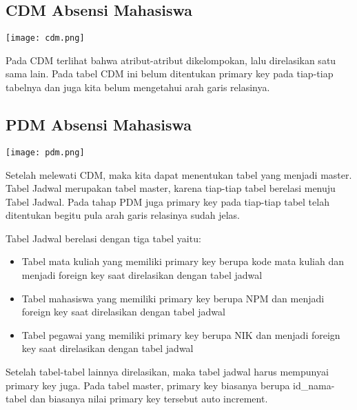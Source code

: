 \documentclass[a4paper,12pt] {article}
\begin{document}
\subsection{CDM Absensi Mahasiswa}
\vspace{0.5cm}
\begin{center}
\texttt{[image: cdm.png]}
\end{center}
\vspace{0.5cm}
\par Pada CDM terlihat bahwa atribut-atribut dikelompokan, lalu direlasikan satu sama lain. Pada tabel CDM ini belum ditentukan primary key pada tiap-tiap tabelnya dan juga kita belum mengetahui arah garis relasinya.
\subsection{PDM Absensi Mahasiswa}
\vspace{0.5cm}
\begin{center}
\texttt{[image: pdm.png]}
\end{center}
\vspace{0.5cm}
\par Setelah melewati CDM, maka kita dapat menentukan tabel yang menjadi master. Tabel Jadwal merupakan tabel master, karena tiap-tiap tabel berelasi menuju Tabel Jadwal. Pada tahap PDM juga primary key pada tiap-tiap tabel telah ditentukan begitu pula arah garis relasinya sudah jelas.
\par Tabel Jadwal berelasi dengan tiga tabel yaitu:
\begin{itemize}
\item Tabel mata kuliah yang memiliki primary key berupa kode mata kuliah dan menjadi foreign key saat direlasikan dengan tabel jadwal
\item Tabel mahasiswa yang memiliki primary key berupa NPM dan menjadi foreign key saat direlasikan dengan tabel jadwal
\item Tabel pegawai yang memiliki primary key berupa NIK dan menjadi foreign key saat direlasikan dengan tabel jadwal
\end{itemize}
\par Setelah tabel-tabel lainnya direlasikan, maka tabel jadwal harus mempunyai primary key juga. Pada tabel master, primary key biasanya berupa id\_nama-tabel dan biasanya nilai primary key tersebut auto increment.
\end{document}
